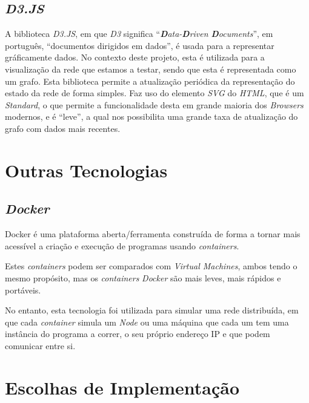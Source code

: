\subsection*{\emph{D3.JS}}
A biblioteca \emph{D3.JS}, em que \emph{D3} significa ``\emph{\textbf{D}ata-\textbf{D}riven \textbf{D}ocuments}'', em português, ``documentos dirigidos em dados'', é usada para a representar gráficamente dados.
No contexto deste projeto, esta é utilizada para a visualização da rede que estamos a testar, sendo que esta é representada como um grafo.
Esta biblioteca permite a atualização periódica da representação do estado da rede de forma simples.
Faz uso do elemento \emph{\acs{SVG}} do \emph{\acs{HTML}}, que é um \emph{Standard}, o que permite a funcionalidade desta em grande maioria dos \emph{Browsers} modernos, e é ``leve'', a qual nos possibilita uma grande taxa de atualização do grafo com dados mais recentes.

\section{Outras Tecnologias}
\label{chap3:outras_tecnologias}
\subsection*{\emph{Docker}}

Docker é uma plataforma aberta/ferramenta construída de forma a tornar mais acessível a criação e execução de programas  usando \emph{containers}.


Estes \emph{containers} podem ser comparados com \emph{Virtual Machines}, ambos tendo o mesmo propósito, mas os \emph{containers} \emph{Docker} são mais leves, mais rápidos e portáveis.


No entanto, esta tecnologia foi utilizada para simular uma rede distribuída, em que cada \emph{container} simula um \emph{Node} ou uma máquina que cada um tem uma instância do programa a correr, o seu próprio endereço \acs{IP} e que podem comunicar entre si.





\section{Escolhas de Implementação}
\label{chap4:escolhas_implementacao}


